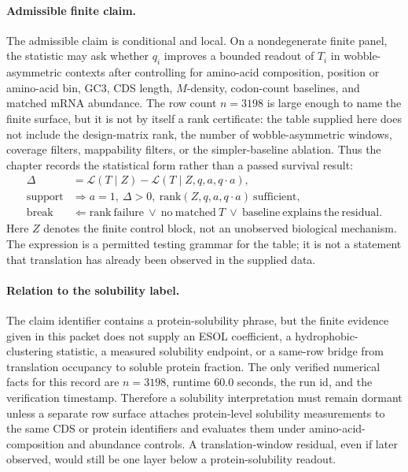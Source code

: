 \paragraph{Admissible finite claim.}
The admissible claim is conditional and local.  On a nondegenerate finite panel, the statistic may ask whether $q_i$ improves a bounded readout of $T_i$ in wobble-asymmetric contexts after controlling for amino-acid composition, position or amino-acid bin, GC3, CDS length, $M$-density, codon-count baselines, and matched mRNA abundance.  The row count $n=3198$ is large enough to name the finite surface, but it is not by itself a rank certificate: the table supplied here does not include the design-matrix rank, the number of wobble-asymmetric windows, coverage filters, mappability filters, or the simpler-baseline ablation.  Thus the chapter records the statistical form rather than a passed survival result:
$$
\begin{aligned}
 \Delta &= \mathcal{L}(T\mid Z) - \mathcal{L}(T\mid Z,q,a,q\cdot a),\\
 \mathrm{support} &\Rightarrow a=1,\ \Delta>0,\ \mathrm{rank}(Z,q,a,q\cdot a)\ \mathrm{sufficient},\\
 \mathrm{break} &\Leftarrow \mathrm{rank\ failure}\ \vee\ \mathrm{no\ matched\ }T\ \vee\ \mathrm{baseline\ explains\ the\ residual}.
\end{aligned}
$$
Here $Z$ denotes the finite control block, not an unobserved biological mechanism.  The expression is a permitted testing grammar for the table; it is not a statement that translation has already been observed in the supplied data.

\paragraph{Relation to the solubility label.}
The claim identifier contains a protein-solubility phrase, but the finite evidence given in this packet does not supply an ESOL coefficient, a hydrophobic-clustering statistic, a measured solubility endpoint, or a same-row bridge from translation occupancy to soluble protein fraction.  The only verified numerical facts for this record are $n=3198$, runtime $60.0$ seconds, the run id, and the verification timestamp.  Therefore a solubility interpretation must remain dormant unless a separate row surface attaches protein-level solubility measurements to the same CDS or protein identifiers and evaluates them under amino-acid-composition and abundance controls.  A translation-window residual, even if later observed, would still be one layer below a protein-solubility readout.

